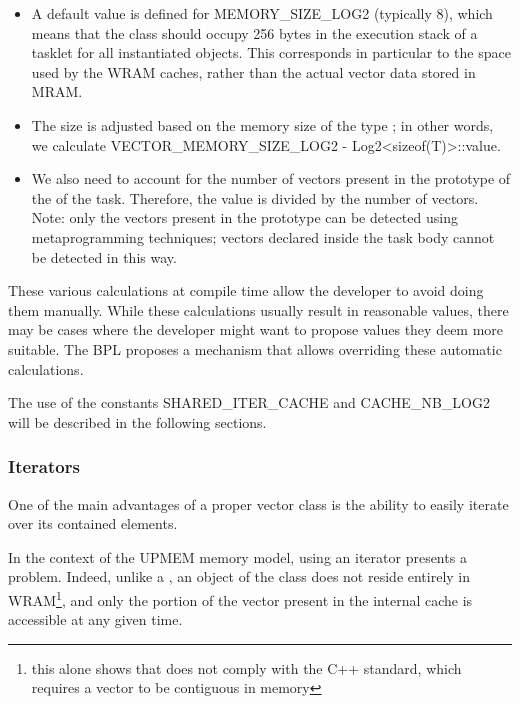 \begin{itemize}

\item A default value is defined for MEMORY\_SIZE\_LOG2 (typically 8), which means that the  class should occupy 256 bytes in the execution stack of a tasklet for all instantiated objects. This corresponds in particular to the space used by the WRAM caches, rather than the actual vector data stored in MRAM.

\item The size is adjusted based on the memory size of the type ; in other words, we calculate VECTOR\_MEMORY\_SIZE\_LOG2 - Log2\textless sizeof(T)\textgreater::value.

\item We also need to account for the number of vectors present in the prototype of the  of the task.  Therefore, the value is divided by the number of vectors. Note: only the vectors present in the prototype can be 
detected using metaprogramming techniques; vectors declared inside the task body cannot be detected in this way.

\end{itemize}

These various calculations at compile time allow the developer to avoid doing them manually. While these calculations usually result in reasonable values, there may be cases where the developer might want to propose values they deem more suitable. The BPL proposes a mechanism that allows overriding these automatic calculations.

The use of the constants SHARED\_ITER\_CACHE and CACHE\_NB\_LOG2 will be described in the following sections. 

\subsubsection{Iterators}

One of the main advantages of a proper vector class is the ability to easily iterate over its contained elements.

In the context of the UPMEM memory model, using an iterator presents a problem. 
Indeed, unlike a , an object of the  class does not reside entirely in WRAM\footnote{this alone shows that  does not comply with the C++ standard, which requires a vector to be contiguous in memory}, and only the portion of the vector present in the internal cache is accessible at any given time.

